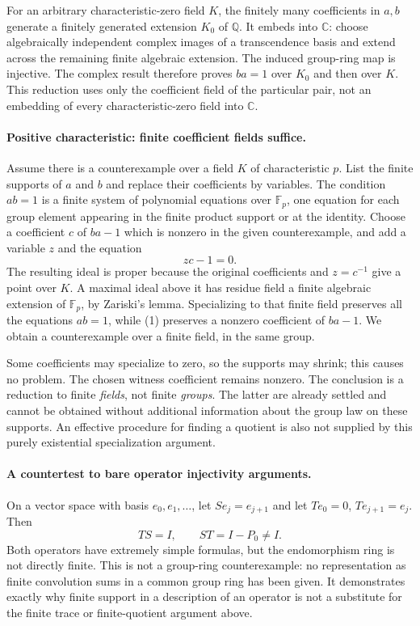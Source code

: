 \documentclass[11pt]{article}
\begin{document}
For an arbitrary characteristic-zero field $K$, the finitely many
coefficients in $a,b$ generate a finitely generated extension $K_0$ of
$\mathbb Q$. It embeds into $\mathbb C$: choose algebraically
independent complex images of a transcendence basis and extend across
the remaining finite algebraic extension. The induced group-ring map
is injective. The complex result therefore proves $ba=1$ over $K_0$
and then over $K$. This reduction uses only the coefficient field of
the particular pair, not an embedding of every characteristic-zero
field into $\mathbb C$.

\paragraph{Positive characteristic: finite coefficient fields suffice.}
Assume there is a counterexample over a field $K$ of characteristic
$p$. List the finite supports of $a$ and $b$ and replace their
coefficients by variables. The condition $ab=1$ is a finite system of
polynomial equations over $\mathbb F_p$, one equation for each group
element appearing in the finite product support or at the identity.
Choose a coefficient $c$ of $ba-1$ which is nonzero in the given
counterexample, and add a variable $z$ and the equation
\[
 zc-1=0.                                               \tag{1}
\]
The resulting ideal is proper because the original coefficients and
$z=c^{-1}$ give a point over $K$. A maximal ideal above it has residue
field a finite algebraic extension of $\mathbb F_p$, by Zariski's
lemma. Specializing to that finite field preserves all the equations
$ab=1$, while (1) preserves a nonzero coefficient of $ba-1$.
We obtain a counterexample over a finite field, in the same group.

Some coefficients may specialize to zero, so the supports may shrink;
this causes no problem. The chosen witness coefficient remains nonzero.
The conclusion is a reduction to finite \emph{fields}, not finite
\emph{groups}. The latter are already settled and cannot be obtained
without additional information about the group law on these supports.
An effective procedure for finding a quotient is also not supplied by
this purely existential specialization argument.

\paragraph{A countertest to bare operator injectivity arguments.}
On a vector space with basis $e_0,e_1,\ldots$, let $S e_j=e_{j+1}$
and let $T e_0=0$, $T e_{j+1}=e_j$. Then
\[
 TS=I,\qquad ST=I-P_0\ne I.
\]
Both operators have extremely simple formulas, but the endomorphism
ring is not directly finite. This is not a group-ring counterexample:
no representation as finite convolution sums in a common group ring
has been given. It demonstrates exactly why finite support in a
description of an operator is not a substitute for the finite trace
or finite-quotient argument above.
\end{document}
